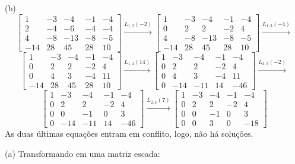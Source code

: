 \documentclass{homework}
\begin{document}
(b)
\[\left[\begin{array}{cccc|c}
1 & -3 & -4 & -1 & -4\\
2 & -4 & -6 & -4 & -4\\
4 & -8 & -13 & -8 & -5\\
-14 & 28 & 45 & 28 & 10
\end{array}\right] \xrightarrow{L_{1,2}(-2)}
\left[\begin{array}{cccc|c}
1 & -3 & -4 & -1 & -4\\
0 & 2 & 2 & -2 & 4\\
4 & -8 & -13 & -8 & -5\\
-14 & 28 & 45 & 28 & 10
\end{array}\right] \xrightarrow{L_{1,3}(-4)}\]
\[\left[\begin{array}{cccc|c}
1 & -3 & -4 & -1 & -4\\
0 & 2 & 2 & -2 & 4\\
0 & 4 & 3 & -4 & 11\\
-14 & 28 & 45 & 28 & 10
\end{array}\right] \xrightarrow{L_{1,4}(14)}
\left[\begin{array}{cccc|c}
1 & -3 & -4 & -1 & -4\\
0 & 2 & 2 & -2 & 4\\
0 & 4 & 3 & -4 & 11\\
0 & -14 & -11 & 14 & -46
\end{array}\right] \xrightarrow{L_{2,3}(-2)}\]
\[\left[\begin{array}{cccc|c}
1 & -3 & -4 & -1 & -4\\
0 & 2 & 2 & -2 & 4\\
0 & 0 & -1 & 0 & 3\\
0 & -14 & -11 & 14 & -46
\end{array}\right] \xrightarrow{L_{2,4}(7)}
\left[\begin{array}{cccc|c}
1 & -3 & -4 & -1 & -4\\
0 & 2 & 2 & -2 & 4\\
0 & 0 & -1 & 0 & 3\\
0 & 0 & 3 & 0 & -18
\end{array}\right]\]
As duas últimas equações entram em conflito, logo, não há soluções.

\exercise
(a) Transformando em uma matriz escada:
\end{document}
